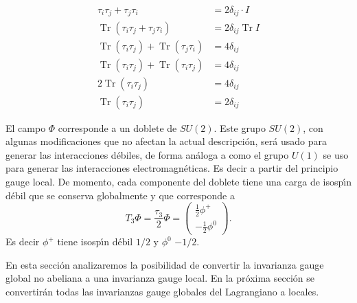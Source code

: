\begin{align}
  \tau_i\tau_j+\tau_j\tau_i&=2\delta_{ij}\cdot I\nonumber\\
\operatorname{Tr}(\tau_i\tau_j+\tau_j\tau_i)&=2\delta_{ij}\operatorname{Tr}I\nonumber\\
\operatorname{Tr}(\tau_i\tau_j)+\operatorname{Tr}(\tau_j\tau_i)&=4\delta_{ij}\nonumber\\
\operatorname{Tr}(\tau_i\tau_j)+\operatorname{Tr}(\tau_i\tau_j)&=4\delta_{ij}\nonumber\\
2\operatorname{Tr}(\tau_i\tau_j)&=4\delta_{ij}\nonumber\\
\operatorname{Tr}(\tau_i\tau_j)&=2\delta_{ij}\nonumber
\end{align}

El campo $\Phi$ corresponde a un doblete de $SU(2)$. Este grupo $SU(2)$, con algunas modificaciones que no afectan la actual descripci\'on, ser\'a usado para generar las interacciones d\'ebiles, de forma an\'aloga a como el grupo $U(1)$ se uso para generar las interacciones electromagn\'eticas. Es decir a partir del principio gauge local. De momento, cada componente del doblete tiene una carga de isosp\'\i n d\'ebil que se conserva globalmente y que corresponde a
\begin{equation}
  T_3\Phi=\frac{\tau_3}{2}\Phi=
  \begin{pmatrix}
\frac{1}{2}\phi^+\\
-\frac{1}{2}\phi^0    
  \end{pmatrix}.
\end{equation}
Es decir $\phi^+$ tiene isosp\'\i n d\'ebil $1/2$ y $\phi^0$ $-1/2$.

En esta secci\'on analizaremos la posibilidad de convertir la invarianza gauge global no abeliana a una invarianza gauge local. En la pr\'oxima secci\'on se convertir\'an todas las invarianzas gauge globales del Lagrangiano a locales. 

